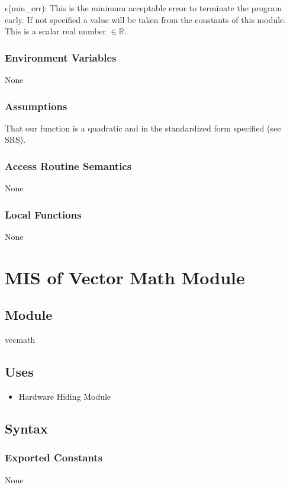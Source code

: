 \documentclass[12pt, titlepage]{article}
\begin{document}
\noindent $\epsilon$(min\_err): This is the minimum acceptable error to terminate the program early. If not specified a value will be taken from the constants of this module. This is a scalar real number $\in \mathbb{R}$.

\subsubsection{Environment Variables}

None

\subsubsection{Assumptions}

That our function is a quadratic and in the standardized form specified (see SRS). 

\subsubsection{Access Routine Semantics}
None


\subsubsection{Local Functions}

None


\section{MIS of Vector Math Module}\label{Module:VectorMath}

\subsection{Module}
vecmath


\subsection{Uses}
\begin{itemize}
    \item Hardware Hiding Module
\end{itemize}

\subsection{Syntax}

\subsubsection{Exported Constants}
None
\end{document}
